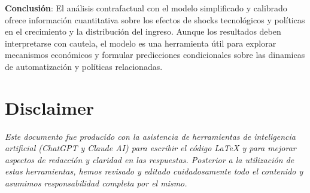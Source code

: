 \documentclass{article}
\theoremstyle{remark}
\theoremstyle{definition}
\begin{document}
\begin{enumerate}
\begin{tcolorbox}[title= Soluci\'on 7]
\begin{enumerate}[label=(\alph*)]
\end{enumerate}

\noindent\textbf{Conclusión}: El análisis contrafactual con el modelo simplificado y calibrado ofrece información cuantitativa sobre los efectos de shocks tecnológicos y políticas en el crecimiento y la distribución del ingreso. Aunque los resultados deben interpretarse con cautela, el modelo es una herramienta útil para explorar mecanismos económicos y formular predicciones condicionales sobre las dinamicas de automatizaci\'on y políticas relacionadas.

        
        \end{tcolorbox}
    
\end{enumerate}

\nocite{*}
\printbibliography

\section*{Disclaimer}
\textit{Este documento fue producido con la asistencia de herramientas de inteligencia artificial (ChatGPT y Claude AI) para escribir el código LaTeX y para mejorar aspectos de redacción y claridad en las respuestas. Posterior a la utilización de estas herramientas, hemos revisado y editado cuidadosamente todo el contenido y asumimos responsabilidad completa por el mismo.}
\end{document}
